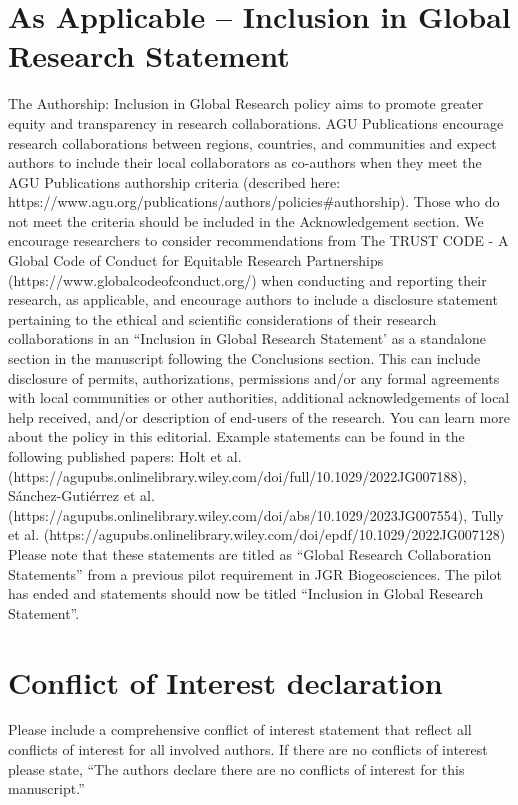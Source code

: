 \documentclass[draft]{agujournal2019}
\begin{document}
\section*{As Applicable – Inclusion in Global Research Statement}
The Authorship: Inclusion in Global Research policy aims to promote greater equity and transparency in research collaborations. AGU Publications encourage research collaborations between regions, countries, and communities and expect authors to include their local collaborators as co-authors when they meet the AGU Publications authorship criteria (described here: https://www.agu.org/publications/authors/policies\#authorship). Those who do not meet the criteria should be included in the Acknowledgement section. We encourage researchers to consider recommendations from The TRUST CODE - A Global Code of Conduct for Equitable Research Partnerships (https://www.globalcodeofconduct.org/) when conducting and reporting their research, as applicable, and encourage authors to include a disclosure statement pertaining to the ethical and scientific considerations of their research collaborations in an “Inclusion in Global Research Statement’ as a standalone section in the manuscript following the Conclusions section. This can include disclosure of permits, authorizations, permissions and/or any formal agreements with local communities or other authorities, additional acknowledgements of local help received, and/or description of end-users of the research. You can learn more about the policy in this editorial. Example statements can be found in the following published papers: 
Holt et al. (https://agupubs.onlinelibrary.wiley.com/doi/full/10.1029/2022JG007188), 
Sánchez-Gutiérrez et al. (https://agupubs.onlinelibrary.wiley.com/doi/abs/10.1029/2023JG007554), 
Tully et al. (https://agupubs.onlinelibrary.wiley.com/doi/epdf/10.1029/2022JG007128) 
Please note that these statements are titled as “Global Research Collaboration Statements” from a previous pilot requirement in JGR Biogeosciences. The pilot has ended and statements should now be titled “Inclusion in Global Research Statement”.


\section*{Conflict of Interest declaration}
Please include a comprehensive conflict of interest statement that reflect all conflicts of interest for all involved authors. If there are no conflicts of interest please state, “The authors declare there are no conflicts of interest for this manuscript.”
\end{document}
